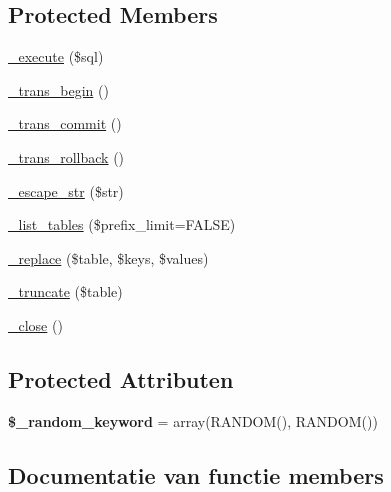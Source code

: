 \subsection*{Protected Members}
\begin{DoxyCompactItemize}
\item 
\mbox{\hyperlink{class_c_i___d_b__sqlite3__driver_a114ab675d89bf8324a41785fb475e86d}{\+\_\+execute}} (\$sql)
\item 
\mbox{\hyperlink{class_c_i___d_b__sqlite3__driver_ac81ac882c1d54347d810199a15856aac}{\+\_\+trans\+\_\+begin}} ()
\item 
\mbox{\hyperlink{class_c_i___d_b__sqlite3__driver_a6fe7f373e0b11cfae23a5f41c0b35dda}{\+\_\+trans\+\_\+commit}} ()
\item 
\mbox{\hyperlink{class_c_i___d_b__sqlite3__driver_ad49a116b0776c26b53114c9093fd102a}{\+\_\+trans\+\_\+rollback}} ()
\item 
\mbox{\hyperlink{class_c_i___d_b__sqlite3__driver_af8ef0237bfcdb19215b63fff769e7a55}{\+\_\+escape\+\_\+str}} (\$str)
\item 
\mbox{\hyperlink{class_c_i___d_b__sqlite3__driver_a435c0f3ce54fe7daa178baa8532ebd54}{\+\_\+list\+\_\+tables}} (\$prefix\+\_\+limit=F\+A\+L\+SE)
\item 
\mbox{\hyperlink{class_c_i___d_b__sqlite3__driver_ae0adf73984daf2d42ad29b66c484c82b}{\+\_\+replace}} (\$table, \$keys, \$values)
\item 
\mbox{\hyperlink{class_c_i___d_b__sqlite3__driver_aa029600528fc1ce660a23ff4b4667f95}{\+\_\+truncate}} (\$table)
\item 
\mbox{\hyperlink{class_c_i___d_b__sqlite3__driver_a4d9082658000e5ede8312067c6dda9db}{\+\_\+close}} ()
\end{DoxyCompactItemize}
\subsection*{Protected Attributen}
\begin{DoxyCompactItemize}
\item 
\mbox{\label{class_c_i___d_b__sqlite3__driver_a10213aa6e05f6d924d3277bb1d2fea00}} 
{\bfseries \$\+\_\+random\+\_\+keyword} = array(\textquotesingle{}R\+A\+N\+D\+OM()\textquotesingle{}, \textquotesingle{}R\+A\+N\+D\+OM()\textquotesingle{})
\end{DoxyCompactItemize}


\subsection{Documentatie van functie members}
\mbox{\label{class_c_i___d_b__sqlite3__driver_a4d9082658000e5ede8312067c6dda9db}} 
